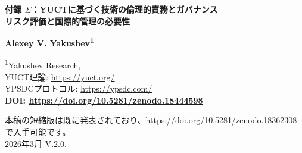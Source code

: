 \documentclass[12pt,a4paper]{article}
\theoremstyle{remark}
\begin{document}
	
	\begin{titlepage}
		\begin{center}
			\vspace*{1cm}
			
			{\Huge\textbf{付録 $\Sigma$：YUCTに基づく技術の倫理的責務とガバナンス}} \\
			\vspace{0.5cm}
			{\Large\textbf{リスク評価と国際的管理の必要性}}
			
			\vspace{1.5cm}
			
			{\Large\textbf{Alexey V. Yakushev\textsuperscript{1}}}
			
			\vspace{0.3cm}
			\large
			\textsuperscript{1}Yakushev Research, \\ 
			YUCT理論: \url{https://yuct.org/}\\
			YPSDCプロトコル: \url{https://ypsdc.com/}\\
			
			\vspace{2cm}
			\textbf{DOI: \url{https://doi.org/10.5281/zenodo.18444598}}\\
			
			\vspace{1cm}
			
			\large 
			本稿の短縮版は既に発表されており、\url{https://doi.org/10.5281/zenodo.18362308} で入手可能です。\\
			\vspace{1cm}
			2026年3月 \quad \large V.2.0.
			
			\vspace{1cm}
			\newpage
			\begin{minipage}{0.9\textwidth}
				\begin{abstract}
					\noindent
					Yakushev統一コーディネーション理論（YUCT）は、物理学、化学、生物学、社会科学を統一する数学的枠組みを提供する。精密化学や地球物理探査から経済予測、認知機能強化に至るその実用的応用は、かつてない恩恵と害悪の両方をもたらす可能性を秘めている。本付録では、YUCTから派生した主要技術、および理論が生み出す新たな生成的科学分野に関連するリスクを体系的に検討する。これらのツールの強大さこそが、禁止ではなく、管理、開発の平等性、適用範囲の意識的拡大に基づく新たなレベルのグローバルガバナンスを要求することを論じる。核不拡散の成功事例を参考に、枠組み条約、検証機関、輸出管理体制、国連安全保障理事会決議を含む多層的な国際アーキテクチャを提案する。惑星規模から宇宙論的レベルに至るスケーリング効果と、予防的倫理考察の必要性に特に注意を払う。
				\end{abstract}
			\end{minipage}
			

\end{center}
\end{titlepage}
\end{document}
